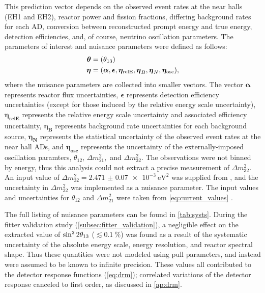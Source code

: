 This prediction vector depends on the observed event rates at the near halls (EH1 and EH2),
reactor power and fission fractions,
differing background rates for each AD,
conversion between reconstructed prompt energy and true \nuebar{} energy,
detection efficiencies,
and, of course, neutrino oscillation parameters.
The parameters of interest and nuisance parameters were defined as follows:
\begin{align}
    \begin{split}
        \boldsymbol{\theta} &= (\theta_{13}) \\
        \boldsymbol{\eta} &= (
            \boldsymbol{\alpha},
            \boldsymbol{\epsilon},
            \boldsymbol{\eta_{\text{relE}}},
            \boldsymbol{\eta}_B,
            \boldsymbol{\eta}_N,
            \boldsymbol{\eta_{\text{osc}}}),
    \end{split}
\end{align}
where the nuisance parameters are collected into smaller vectors.
The vector $\boldsymbol{\alpha}$ represents reactor \nuebar{} flux uncertainties,
$\boldsymbol{\epsilon}$ represents detection efficiency uncertainties
(except for those induced by the relative energy scale uncertainty),
$\boldsymbol{\eta_{\text{relE}}}$ represents the relative energy scale uncertainty
and associated efficiency uncertainty,
$\boldsymbol{\eta_B}$ represents background rate uncertainties for each background source,
$\boldsymbol{\eta_N}$ represents the statistical uncertainty
of the observed event rates at the near hall ADs,
and $\boldsymbol{\eta_{\text{osc}}}$ represents the uncertainty
of the externally-imposed oscillation paramters, $\theta_{12},\,\Delta m^2_{21},$
and $\Delta m^2_{32}${}.
The observations were not binned by energy,
thus this analysis could not extract
a precise measurement of $\Delta m^2_{32}$.
An input value of $\Delta m^2_{32} = \SI{2.471(70)e-3}{\eV\squared}$
was supplied from \cite{ngd2018}, and
the uncertainty in $\Delta m^2_{32}${} was implemented as a nuisance parameter.
The input values and uncertainties for $\theta_{12}$ and $\Delta m^2_{21}$
were taken from \cref{eq:current_values} \cite{pdg}.

The full listing of nuisance parameters
can be found in \cref{tab:systs}.
During the fitter validation study (\cref{subsec:fitter_validation}),
a negligible effect on the extracted value of $\sin^22\theta_{13}$
($\lesssim\SI{0.1}{\percent}$)
was found as a result of the systematic uncertainty
of the absolute energy scale, energy resolution,
and reactor \nuebar{} spectral shape.
Thus these quantities were not modeled using pull parameters,
and instead were assumed to be known to infinite precision.
These values all contributed to the detector response functions
(\cref{eq:drm});
correlated variations of the detector response
canceled to first order, as discussed in \cref{ap:drm}.

